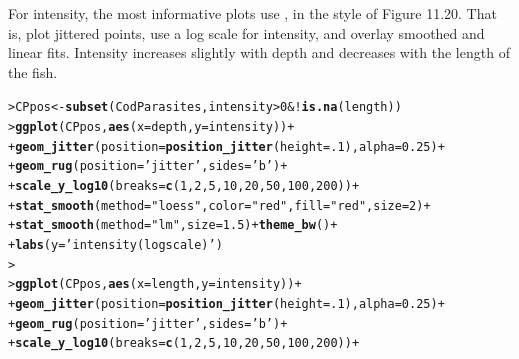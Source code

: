 \documentclass[10pt]{report}\usepackage[]{graphicx}\usepackage[]{color}
\makeatletter
\newcommand{\hlnum}[1]{\textcolor[rgb]{0.686,0.059,0.569}{#1}}%
\newcommand{\hlstr}[1]{\textcolor[rgb]{0.192,0.494,0.8}{#1}}%
\newcommand{\hlopt}[1]{\textcolor[rgb]{0,0,0}{#1}}%
\newcommand{\hlstd}[1]{\textcolor[rgb]{0.345,0.345,0.345}{#1}}%
\newcommand{\hlkwb}[1]{\textcolor[rgb]{0.69,0.353,0.396}{#1}}%
\newcommand{\hlkwc}[1]{\textcolor[rgb]{0.333,0.667,0.333}{#1}}%
\newcommand{\hlkwd}[1]{\textcolor[rgb]{0.737,0.353,0.396}{\textbf{#1}}}%
\newenvironment{kframe}{%
 \def\at@end@of@kframe{}%
 \ifinner\ifhmode%
  \def\at@end@of@kframe{\end{minipage}}%
  \begin{minipage}{\columnwidth}%
 \fi\fi%
 \def\FrameCommand##1{\hskip\@totalleftmargin \hskip-\fboxsep
 \colorbox{shadecolor}{##1}\hskip-\fboxsep
     \hskip-\linewidth \hskip-\@totalleftmargin \hskip\columnwidth}%
 \MakeFramed {\advance\hsize-\width
   \@totalleftmargin\z@ \linewidth\hsize
   \@setminipage}}%
 {\par\unskip\endMakeFramed%
 \at@end@of@kframe}
\newenvironment{knitrout}{}{} %
\renewenvironment{knitrout}{\small\renewcommand{\baselinestretch}{.85}}{} %
\makeatother
\begin{document}
\begin{Exercises}
\begin{ans}
\begin{knitrout}
\end{knitrout}
  For intensity, the most informative plots use , in the style of Figure 11.20.
  That is, plot jittered points, use a log scale for intensity, and overlay smoothed and
  linear fits.  Intensity increases slightly with depth and decreases with the length
  of the fish.
\begin{knitrout}\footnotesize
{}\color{fgcolor}\begin{kframe}
\begin{alltt}
\hlstd{> }\hlstd{CPpos} \hlkwb{<-} \hlkwd{subset}\hlstd{(CodParasites, intensity}\hlopt{>}\hlnum{0} \hlopt{& !}\hlkwd{is.na}\hlstd{(length))}
\hlstd{> }\hlkwd{ggplot}\hlstd{(CPpos,} \hlkwd{aes}\hlstd{(}\hlkwc{x}\hlstd{=depth,} \hlkwc{y}\hlstd{=intensity))} \hlopt{+}
\hlstd{+ }        \hlkwd{geom_jitter}\hlstd{(}\hlkwc{position}\hlstd{=}\hlkwd{position_jitter}\hlstd{(}\hlkwc{height}\hlstd{=}\hlnum{.1}\hlstd{),} \hlkwc{alpha}\hlstd{=}\hlnum{0.25}\hlstd{)} \hlopt{+}
\hlstd{+ }        \hlkwd{geom_rug}\hlstd{(}\hlkwc{position}\hlstd{=}\hlstr{'jitter'}\hlstd{,} \hlkwc{sides}\hlstd{=}\hlstr{'b'}\hlstd{)} \hlopt{+}
\hlstd{+ }        \hlkwd{scale_y_log10}\hlstd{(}\hlkwc{breaks}\hlstd{=}\hlkwd{c}\hlstd{(}\hlnum{1}\hlstd{,}\hlnum{2}\hlstd{,}\hlnum{5}\hlstd{,}\hlnum{10}\hlstd{,}\hlnum{20}\hlstd{,}\hlnum{50}\hlstd{,}\hlnum{100}\hlstd{,} \hlnum{200}\hlstd{))} \hlopt{+}
\hlstd{+ }        \hlkwd{stat_smooth}\hlstd{(}\hlkwc{method}\hlstd{=}\hlstr{"loess"}\hlstd{,} \hlkwc{color}\hlstd{=}\hlstr{"red"}\hlstd{,} \hlkwc{fill}\hlstd{=}\hlstr{"red"}\hlstd{,} \hlkwc{size}\hlstd{=}\hlnum{2}\hlstd{)} \hlopt{+}
\hlstd{+ }        \hlkwd{stat_smooth}\hlstd{(}\hlkwc{method}\hlstd{=}\hlstr{"lm"}\hlstd{,} \hlkwc{size}\hlstd{=}\hlnum{1.5}\hlstd{)} \hlopt{+} \hlkwd{theme_bw}\hlstd{()} \hlopt{+}
\hlstd{+ }        \hlkwd{labs}\hlstd{(}\hlkwc{y}\hlstd{=}\hlstr{'intensity (log scale)'}\hlstd{)}
\hlstd{> }
\hlstd{> }\hlkwd{ggplot}\hlstd{(CPpos,} \hlkwd{aes}\hlstd{(}\hlkwc{x}\hlstd{=length,} \hlkwc{y}\hlstd{=intensity))} \hlopt{+}
\hlstd{+ }        \hlkwd{geom_jitter}\hlstd{(}\hlkwc{position}\hlstd{=}\hlkwd{position_jitter}\hlstd{(}\hlkwc{height}\hlstd{=}\hlnum{.1}\hlstd{),} \hlkwc{alpha}\hlstd{=}\hlnum{0.25}\hlstd{)} \hlopt{+}
\hlstd{+ }        \hlkwd{geom_rug}\hlstd{(}\hlkwc{position}\hlstd{=}\hlstr{'jitter'}\hlstd{,} \hlkwc{sides}\hlstd{=}\hlstr{'b'}\hlstd{)} \hlopt{+}
\hlstd{+ }        \hlkwd{scale_y_log10}\hlstd{(}\hlkwc{breaks}\hlstd{=}\hlkwd{c}\hlstd{(}\hlnum{1}\hlstd{,}\hlnum{2}\hlstd{,}\hlnum{5}\hlstd{,}\hlnum{10}\hlstd{,}\hlnum{20}\hlstd{,}\hlnum{50}\hlstd{,}\hlnum{100}\hlstd{,} \hlnum{200}\hlstd{))} \hlopt{+}

\end{alltt}
\end{kframe}
\end{knitrout}
\end{ans}
\end{Exercises}
\end{document}
